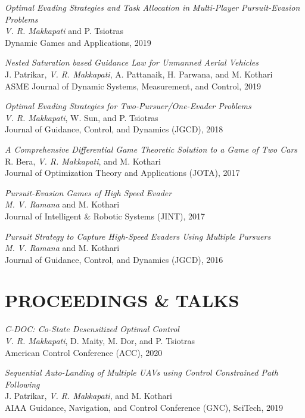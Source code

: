 \documentclass[margin, 10pt]{res} %
\begin{document}
\begin{resume}
{\sl Optimal Evading Strategies and Task Allocation in Multi-Player Pursuit-Evasion Problems} \\
\textit{V. R. Makkapati} and P. Tsiotras \\
Dynamic Games and Applications, 2019

{\sl Nested Saturation based Guidance Law for Unmanned Aerial Vehicles} \\
J. Patrikar, \textit{V. R. Makkapati}, A. Pattanaik, H. Parwana, and M. Kothari \\
ASME Journal of Dynamic Systems, Measurement, and Control, 2019

{\sl Optimal Evading Strategies for Two-Pursuer/One-Evader Problems} \\
\textit{V. R. Makkapati}, W. Sun, and P. Tsiotras \\
Journal of Guidance, Control, and Dynamics (JGCD), 2018

{\sl A Comprehensive Differential Game Theoretic Solution to a Game of Two Cars} \\ 
R. Bera, \textit{V. R. Makkapati}, and M. Kothari \\
Journal of Optimization Theory and Applications (JOTA), 2017 

{\sl Pursuit-Evasion Games of High Speed Evader} \\ 
\textit{M. V. Ramana} and M. Kothari \\
Journal of Intelligent \& Robotic Systems (JINT), 2017

{\sl Pursuit Strategy to Capture High-Speed Evaders Using Multiple Pursuers} \\
\textit{M. V. Ramana} and M. Kothari \\
Journal of Guidance, Control, and Dynamics (JGCD), 2016

\section{PROCEEDINGS \& TALKS}

{\sl C-DOC: Co-State Desensitized Optimal Control}\\
\textit{V. R. Makkapati}, D. Maity, M. Dor, and P. Tsiotras\\
American Control Conference (ACC), 2020

{\sl Sequential Auto-Landing of Multiple UAVs using Control Constrained Path Following} \\
J. Patrikar, \textit{V. R. Makkapati}, and M. Kothari \\
AIAA Guidance, Navigation, and Control Conference (GNC), SciTech, 2019 


\end{resume}
\end{document}
